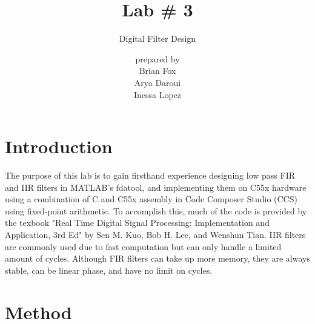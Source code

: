 \documentclass{bannerReport}
\title{Lab \# 3}
\subtitle{Digital Filter Design}
\author{ {\small prepared by} \\ Brian Fox \\Arya Daroui \\ Inessa Lopez}
\begin{document}
 \sloppy

\section{Introduction}
The purpose of this lab is to gain firsthand experience designing low pass FIR and IIR filters in MATLAB’s fdatool, and implementing them on C55x hardware using a combination of C and C55x assembly in Code Composer Studio (CCS) using fixed-point arithmetic. To accomplish this, much of the code is provided by the texbook "Real Time Digital Signal Processing: Implementation and Application, 3rd Ed" by Sen M. Kuo, Bob H. Lee, and Wenshun Tian. IIR filters are commonly used due to fast computation but can only handle a limited amount of cycles. Although FIR filters can take up more memory, they are always stable, can be linear phase, and have no limit on cycles.


\section{Method}
\end{document}
